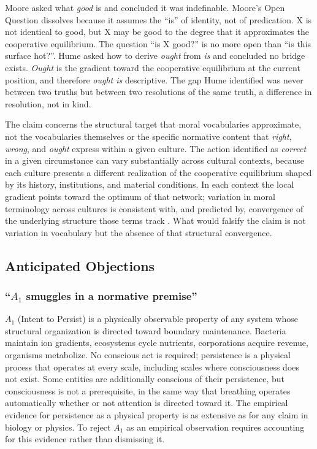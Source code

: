 \documentclass[11pt]{article}
\theoremstyle{plain}
\theoremstyle{definition}
\theoremstyle{remark}
\let\origsubsection\subsection
\renewcommand{\subsection}{\needspace{7\baselineskip}\origsubsection}
\let\origsubsubsection\subsubsection
\renewcommand{\subsubsection}{\needspace{4\baselineskip}\origsubsubsection}
\begin{document}
Moore asked what \emph{good} is and concluded it was indefinable.
Moore's Open Question dissolves because it assumes the ``is'' of
identity, not of predication. X is not identical to good, but X may be
good to the degree that it approximates the cooperative equilibrium. The
question ``is X good?'' is no more open than ``is this surface hot?''.
Hume asked how to derive \emph{ought} from \emph{is} and concluded no
bridge exists. \emph{Ought} is the gradient toward the cooperative
equilibrium at the current position, and therefore \emph{ought is}
descriptive. The gap Hume identified was never between two truths but
between two resolutions of the same truth, a difference in resolution,
not in kind.

The claim concerns the structural target that moral vocabularies
approximate, not the vocabularies themselves or the specific normative
content that \emph{right}, \emph{wrong}, and \emph{ought} express within
a given culture. The action identified as \emph{correct} in a given
circumstance can vary substantially across cultural contexts, because
each culture presents a different realization of the cooperative
equilibrium shaped by its history, institutions, and material
conditions. In each context the local gradient points toward the optimum
of that network; variation in moral terminology across cultures is
consistent with, and predicted by, convergence of the underlying
structure those terms track \citep{Haidt2010, Haidt2003}. What would
falsify the claim is not variation in vocabulary but the absence of that
structural convergence.

\subsection{Anticipated Objections}\label{anticipated-objections}

\subsubsection{\texorpdfstring{``\(A_1\) smuggles in a normative
premise''}{``A\_1 smuggles in a normative premise''}}\label{a_1-smuggles-in-a-normative-premise}

\(A_1\) (Intent to Persist) is a physically observable property of any
system whose structural organization is directed toward boundary
maintenance. Bacteria maintain ion gradients, ecosystems cycle
nutrients, corporations acquire revenue, organisms metabolize. No
conscious act is required; persistence is a physical process that
operates at every scale, including scales where consciousness does not
exist. Some entities are additionally conscious of their persistence,
but consciousness is not a prerequisite, in the same way that breathing
operates automatically whether or not attention is directed toward it.
The empirical evidence for persistence as a physical property is as
extensive as for any claim in biology or physics. To reject \(A_1\) as
an empirical observation requires accounting for this evidence rather
than dismissing it.
\end{document}
